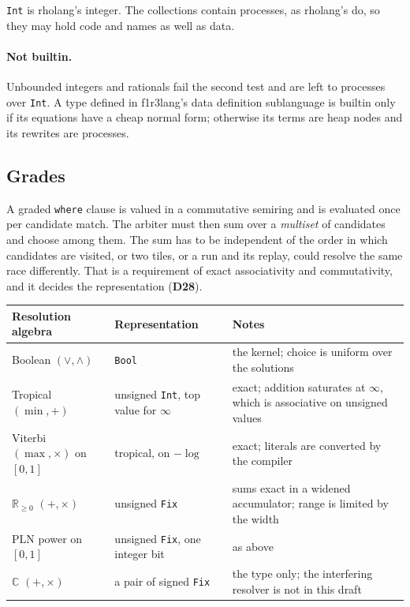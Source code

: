 \documentclass[10.5pt,a4paper]{extarticle}
\newcommand{\kw}[1]{\texttt{#1}}
\newcommand{\dec}[1]{\textbf{D#1}}
\theoremstyle{definition}
\theoremstyle{remark}
\begin{document}
\medskip\noindent
\kw{Int} is rholang's integer. The collections contain
processes, as rholang's do, so they may hold code and names as well as data.

\paragraph{Not builtin.} Unbounded integers and rationals fail the second
test and are left to processes over \kw{Int}. A type defined in f1r3lang's
data definition sublanguage is builtin only if its equations have a cheap
normal form; otherwise its terms are heap nodes and its rewrites are
processes.

\subsection{Grades}\label{sec:grades}

A graded \kw{where} clause is valued in a commutative semiring and is
evaluated once per candidate match. The arbiter must then sum over a
\emph{multiset} of candidates and choose among them. The sum has to be
independent of the order in which candidates are visited, or two tiles, or a
run and its replay, could resolve the same race differently. That is a
requirement of exact associativity and commutativity, and it decides the
representation (\dec{28}).

\medskip\noindent
\begin{tabularx}{\textwidth}{@{}l l X@{}}
\toprule
Resolution algebra & Representation & Notes\\
\midrule
Boolean $(\vee,\wedge)$ & \kw{Bool} & the kernel; choice is uniform over
  the solutions\\
Tropical $(\min,+)$ & unsigned \kw{Int}, top value for $\infty$ & exact;
  addition saturates at $\infty$, which is associative on unsigned values\\
Viterbi $(\max,\times)$ on $[0,1]$ & tropical, on $-\log$ & exact;
  literals are converted by the compiler\\
$\mathbb{R}_{\ge 0}$ $(+,\times)$ & unsigned \kw{Fix} & sums exact in a
  widened accumulator; range is limited by the width\\
PLN power on $[0,1]$ & unsigned \kw{Fix}, one integer bit & as above\\
$\mathbb{C}$ $(+,\times)$ & a pair of signed \kw{Fix} & the type only; the
  interfering resolver is not in this draft\\
\bottomrule
\end{tabularx}
\end{document}
